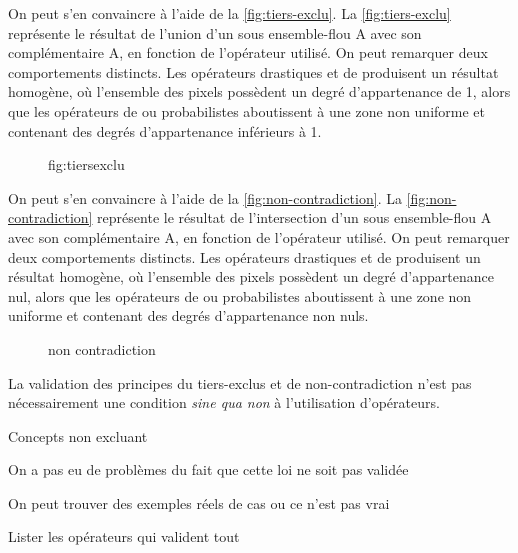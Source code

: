 
On peut s'en convaincre à l'aide de la \autoref{fig:tiers-exclu}. La
\autoref{fig:tiers-exclu} représente le résultat de l'union d'un sous
ensemble-flou \textcolor{RdBu-9-1}{\textsf{A}} avec son complémentaire
\textcolor{RdBu-9-9}{\textsf{A}}, en fonction de l'opérateur
utilisé. On peut remarquer deux comportements distincts. Les
opérateurs drastiques et de  produisent un résultat
homogène, où l'ensemble des pixels possèdent un degré d'appartenance
de 1, alors que les opérateurs de  ou probabilistes
aboutissent à une zone non uniforme et contenant des degrés
d'appartenance inférieurs à 1.

\begin{figure}
  \centering
  
  \caption{fig:tiersexclu}
  \label{fig:tiers-exclu}
\end{figure}


On peut s'en convaincre à l'aide de la
\autoref{fig:non-contradiction}. La \autoref{fig:non-contradiction}
représente le résultat de l'intersection d'un sous ensemble-flou
\textcolor{RdBu-9-1}{\textsf{A}} avec son complémentaire
\textcolor{RdBu-9-9}{\textsf{A}}, en fonction de l'opérateur
utilisé. On peut remarquer deux comportements distincts. Les
opérateurs drastiques et de  produisent un résultat
homogène, où l'ensemble des pixels possèdent un degré d'appartenance
nul, alors que les opérateurs de  ou probabilistes
aboutissent à une zone non uniforme et contenant des degrés
d'appartenance non nuls.


\begin{figure}
  \centering
  
  \caption{non contradiction}
  \label{fig:non-contradiction}
\end{figure}

La validation des principes du tiers-exclus et de non-contradiction
n'est pas nécessairement une condition \emph{sine qua non} à
l'utilisation d'opérateurs. 



Concepts non excluant

On a pas eu de problèmes du fait que cette loi ne soit pas validée

On peut trouver des exemples réels de cas ou ce n'est pas vrai

Lister les opérateurs qui valident tout

